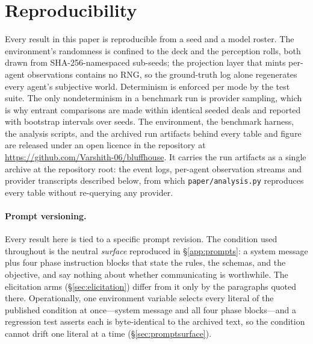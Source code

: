 \documentclass{article}
\begin{document}
\section{Reproducibility}
\label{app:repro}

Every result in this paper is reproducible from a seed and a model roster.
The environment's randomness is confined to the deck and the perception
rolls, both drawn from SHA-256-namespaced sub-seeds; the projection layer
that mints per-agent observations contains no RNG, so the ground-truth log
alone regenerates every agent's subjective world. Determinism is enforced
per mode by the test suite. The only nondeterminism in a benchmark run is
provider sampling, which is why entrant comparisons are made within
identical seeded deals and reported with bootstrap intervals over seeds.
The environment, the benchmark harness, the analysis scripts, and the
archived run artifacts behind every table and figure are released under an
open licence in the repository at
\url{https://github.com/Varshith-06/bluffhouse}. It carries the run artifacts as a single archive at the repository root: the
event logs, per-agent observation streams and provider transcripts described
below, from which \texttt{paper/analysis.py} reproduces every table without
re-querying any provider.

\paragraph{Prompt versioning.} Every result here is tied to a specific
prompt revision. The condition used throughout is the neutral \emph{surface}
reproduced in \S\ref{app:prompts}: a system message plus four phase
instruction blocks that state the rules, the schemas, and the objective, and
say nothing about whether communicating is worthwhile. The elicitation arms
(\S\ref{sec:elicitation}) differ from it only by the paragraphs quoted
there. Operationally, one environment variable selects every literal of the
published condition at once---system message and all four phase blocks---and
a regression test asserts each is byte-identical to the archived text, so
the condition cannot drift one literal at a time (\S\ref{sec:promptsurface}).
\end{document}
